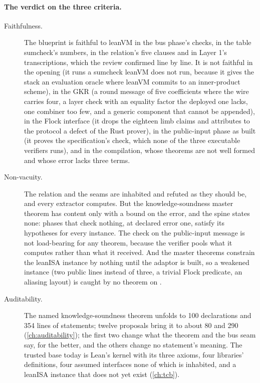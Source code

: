 \paragraph{The verdict on the three criteria.}
\begin{description}
\item[Faithfulness.] The blueprint is faithful to leanVM in the bus phase's checks, in the
  table sumcheck's numbers, in the relation's five clauses and in Layer 1's transcriptions,
  which the review confirmed line by line. It is not faithful in the opening (it runs a
  sumcheck leanVM does not run, because it gives the stack an evaluation oracle where leanVM
  commits to an inner-product scheme), in the GKR (a round message of five coefficients where the wire carries four, a layer
  check with an equality factor the deployed one lacks, one combiner too few, and a
  generic component that cannot be appended), in the Flock interface (it drops the eighteen
  limb claims and attributes to the protocol a defect of the Rust prover), in the public-input
  phase as built (it proves the specification's check, which none of the three executable
  verifiers runs), and in the compilation, whose theorems are not well formed and whose error
  lacks three terms.
\item[Non-vacuity.] The relation and the seams are inhabited and refuted as they should be,
  and every extractor computes. But the knowledge-soundness master theorem has content only
  with a bound on the error, and the spine states none: phases that check nothing, at declared
  error one, satisfy its hypotheses for every instance. The check on the public-input message
  is not load-bearing for any theorem, because the verifier pools what it computes rather than
  what it received. And the master theorems constrain the leanISA instance by nothing until
  the adaptor is built, so a weakened instance (two public lines instead of three, a trivial
  Flock predicate, an aliasing layout) is caught by no theorem on .
\item[Auditability.] The named knowledge-soundness theorem unfolds to 100 declarations and
  354 lines of statements; twelve proposals bring it to about 80 and 290
  (\cref{ch:auditability}); the first two change what the theorem and the bus seam say, for the
  better, and the others change no statement's meaning. The trusted base today is Lean's
  kernel with its three axioms, four libraries' definitions, four assumed interfaces none of
  which is inhabited, and a leanISA instance that does not yet exist (\cref{ch:tcb}).
\end{description}


